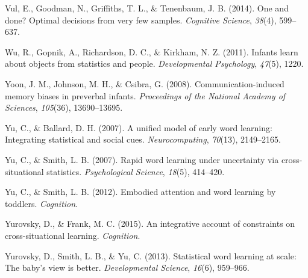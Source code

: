 \documentclass[a4paper,man,floatsintext]{apa6}
\begin{document}
Vul, E., Goodman, N., Griffiths, T. L., \& Tenenbaum, J. B. (2014). One
and done? Optimal decisions from very few samples. \emph{Cognitive
Science}, \emph{38}(4), 599--637.

Wu, R., Gopnik, A., Richardson, D. C., \& Kirkham, N. Z. (2011). Infants
learn about objects from statistics and people. \emph{Developmental
Psychology}, \emph{47}(5), 1220.

Yoon, J. M., Johnson, M. H., \& Csibra, G. (2008). Communication-induced
memory biases in preverbal infants. \emph{Proceedings of the National
Academy of Sciences}, \emph{105}(36), 13690--13695.

Yu, C., \& Ballard, D. H. (2007). A unified model of early word
learning: Integrating statistical and social cues.
\emph{Neurocomputing}, \emph{70}(13), 2149--2165.

Yu, C., \& Smith, L. B. (2007). Rapid word learning under uncertainty
via cross-situational statistics. \emph{Psychological Science},
\emph{18}(5), 414--420.

Yu, C., \& Smith, L. B. (2012). Embodied attention and word learning by
toddlers. \emph{Cognition}.

Yurovsky, D., \& Frank, M. C. (2015). An integrative account of
constraints on cross-situational learning. \emph{Cognition}.

Yurovsky, D., Smith, L. B., \& Yu, C. (2013). Statistical word learning
at scale: The baby's view is better. \emph{Developmental Science},
\emph{16}(6), 959--966.


\end{document}
